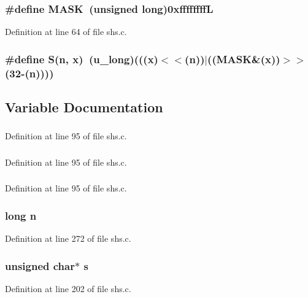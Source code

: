 \subsubsection{\setlength{\rightskip}{0pt plus 5cm}\#define MASK\ (unsigned long)0xffffffff\-L}\label{shs_8c_a0}




Definition at line 64 of file shs.c.
\subsubsection{\setlength{\rightskip}{0pt plus 5cm}\#define S({\bf n}, x)\ (u\_\-long)(((x)$<$$<$({\bf n}))$|$((MASK\&(x))$>$$>$(32-({\bf n}))))}\label{shs_8c_a1}




\subsection{Variable Documentation}
\subsubsection{}\label{shs_8c_a6}




Definition at line 95 of file shs.c.
\subsubsection{}\label{shs_8c_a7}




Definition at line 95 of file shs.c.
\subsubsection{}\label{shs_8c_a8}




Definition at line 95 of file shs.c.
\subsubsection{\setlength{\rightskip}{0pt plus 5cm}long {\bf n}}\label{shs_8c_a10}




Definition at line 272 of file shs.c.
\subsubsection{\setlength{\rightskip}{0pt plus 5cm}unsigned char$\ast$ {\bf s}}\label{shs_8c_a9}




Definition at line 202 of file shs.c.